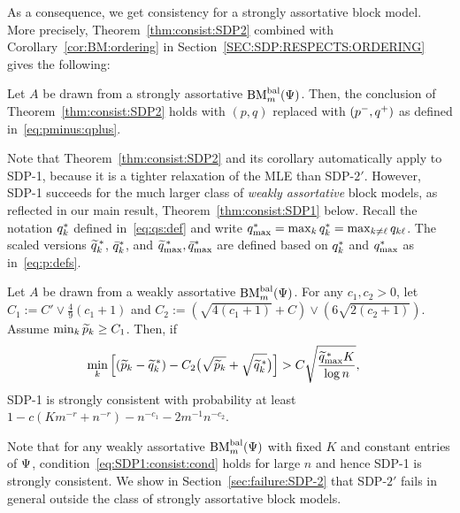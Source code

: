 As a consequence, we get consistency for a strongly assortative block model. More precisely, Theorem~\ref{thm:consist:SDP2} combined with Corollary~\ref{cor:BM:ordering} in Section~\ref{SEC:SDP:RESPECTS:ORDERING} gives the following:
\begin{cor}\label{cor:SDP2:consist:strong:assort}
  Let $A$ be drawn from a strongly assortative $\textrm{BM}^{\textrm{bal}}_m(\Psi)$. Then, the conclusion of Theorem~\ref{thm:consist:SDP2} holds with $(p,q)$ replaced with $(p^-,q^+)$ as defined in~\eqref{eq:pminus:qplus}.
\end{cor}

Note that Theorem~\ref{thm:consist:SDP2} and its corollary automatically apply to SDP-1, because it is a tighter relaxation of the MLE than SDP-$2'$. However, SDP-1 succeeds for the much larger class of \emph{weakly assortative} block models, as reflected in our main result, Theorem~\ref{thm:consist:SDP1} below. Recall the notation $q^*_k$ defined in~\eqref{eq:qs:def} and write $q^*_{\max} = \max_k q^*_k = \max_{k \neq \ell} q_{k\ell}$. The scaled versions $\widetilde{q}^{\,*}_k$, $\bar{q}^*_k$, and  $\widetilde{q}^{\,*}_{\max}, \bar{q}^{*}_{\max}$ are defined based on $q^*_k$ and $q^*_{\max}$ as in~\eqref{eq:p:defs}.
\begin{thm} \label{thm:consist:SDP1}
  Let $A$ be drawn from a weakly assortative $\textrm{BM}^{\textrm{bal}}_m(\Psi)$.
  For any $c_1,c_2 > 0$, let $C_1 := C' \vee \frac{4}{9}(c_1+1)$ and $C_2 := (\sqrt{4(c_1+1)} + C) \vee (6 \sqrt{2 (c_2+1)})$. Assume $\min_k \widetilde{p}_k \ge C_1 $. Then, if 
  \begin{align}\label{eq:SDP1:consist:cond}
  \min_k \Big[  (\widetilde{p}_k - \widetilde{q}^{\,*}_k) - C_2 \big(\sqrt{\widetilde{p}_k } + \sqrt{\widetilde{q}^{\,*}_k }\big) 
    \Big] &> C \sqrt{\frac{\widetilde{q}^{\,*}_{\max} K}{\log n}},
  \end{align}
  SDP-1 is strongly consistent with probability at least $1 - c(Km^{-r} + n^{-r}) -n^{-c_1} - 2m^{-1}n^{-c_2}$.
  \end{thm}
 
 Note that for any weakly assortative $\textrm{BM}^{\textrm{bal}}_m(\Psi)$ with fixed $K$ and constant entries of $\Psi$, condition~\eqref{eq:SDP1:consist:cond} holds for large $n$ and hence SDP-1 is strongly consistent. We show in Section~\ref{sec:failure:SDP-2} that SDP-$2'$ fails in general outside the class of strongly assortative block models.



